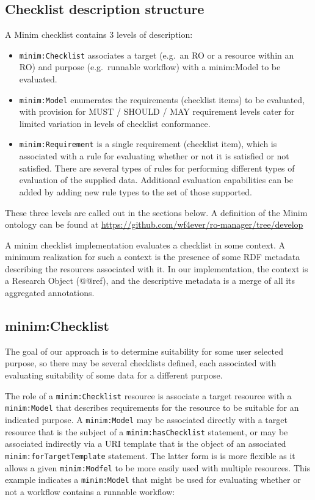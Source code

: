 \documentclass[]{article}
\begin{document}
\subsection{Checklist description structure}

A Minim checklist contains 3 levels of description:

\begin{itemize}
\itemsep1pt\parskip0pt
\item
  \texttt{minim:Checklist} associates a target (e.g.~an RO or a resource
  within an RO) and purpose (e.g.~runnable workflow) with a minim:Model
  to be evaluated.
\item
  \texttt{minim:Model} enumerates the requirements (checklist items) to
  be evaluated, with provision for MUST / SHOULD / MAY requirement
  levels cater for limited variation in levels of checklist conformance.
\item
  \texttt{minim:Requirement} is a single requirement (checklist item),
  which is associated with a rule for evaluating whether or not it is
  satisfied or not satisfied. There are several types of rules for
  performing different types of evaluation of the supplied data.
  Additional evaluation capabilities can be added by adding new rule
  types to the set of those supported.
\end{itemize}

These three levels are called out in the sections below. A definition of
the Minim ontology can be found at
\href{}{https://github.com/wf4ever/ro-manager/tree/develop}

A minim checklist implementation evaluates a checklist in some context.
A minimum realization for such a context is the presence of some RDF
metadata describing the resources associated with it. In our
implementation, the context is a Research Object (@@ref), and the
descriptive metadata is a merge of all its aggregated annotations.

\subsection{minim:Checklist}

The goal of our approach is to determine suitability for some user
selected purpose, so there may be several checklists defined, each
associated with evaluating suitability of some data for a different
purpose.

The role of a \texttt{minim:Checklist} resource is associate a target
resource with a \texttt{minim:Model} that describes requirements for the
resource to be suitable for an indicated purpose. A \texttt{minim:Model}
may be associated directly with a target resource that is the subject of
a \texttt{minim:hasChecklist} statement, or may be associated indirectly
via a URI template that is the object of an associated
\texttt{minim:forTargetTemplate} statement. The latter form is is more
flexible as it allows a given \texttt{minim:Modfel} to be more easily
used with multiple resources. This example indicates a
\texttt{minim:Model} that might be used for evaluating whether or not a
workflow contains a runnable workflow:
\end{document}
